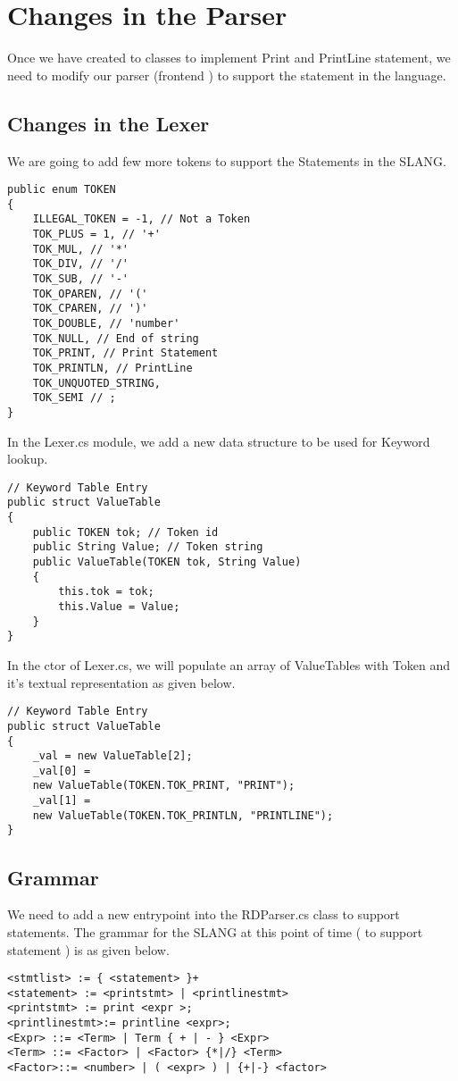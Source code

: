 \section{Changes in the Parser}
Once we have created to classes to implement Print and PrintLine statement, we need to modify our
parser (frontend ) to support the statement in the language.\\
\subsection{Changes in the Lexer}
We are going to add few more tokens to support the Statements in the SLANG.\\
\lstset{style=csharp}
\begin{lstlisting}
public enum TOKEN
{
	ILLEGAL_TOKEN = -1, // Not a Token
	TOK_PLUS = 1, // '+'
	TOK_MUL, // '*'
	TOK_DIV, // '/'
	TOK_SUB, // '-'
	TOK_OPAREN, // '('
	TOK_CPAREN, // ')'
	TOK_DOUBLE, // 'number'
	TOK_NULL, // End of string
	TOK_PRINT, // Print Statement
	TOK_PRINTLN, // PrintLine
	TOK_UNQUOTED_STRING,
	TOK_SEMI // ;
}
\end{lstlisting}
In the Lexer.cs module, we add a new data structure to be used for Keyword lookup.
\lstset{style=csharp}
\begin{lstlisting}
// Keyword Table Entry
public struct ValueTable
{
	public TOKEN tok; // Token id
	public String Value; // Token string
	public ValueTable(TOKEN tok, String Value)
	{
		this.tok = tok;
		this.Value = Value;
	}
}
\end{lstlisting}
In the ctor of Lexer.cs, we will populate an array of ValueTables with Token and it's textual representation as given below.
\lstset{style=csharp}
\begin{lstlisting}
// Keyword Table Entry
public struct ValueTable
{
	_val = new ValueTable[2];
	_val[0] = 
	new ValueTable(TOKEN.TOK_PRINT, "PRINT");
	_val[1] = 
	new ValueTable(TOKEN.TOK_PRINTLN, "PRINTLINE");
}
\end{lstlisting}
\subsection{Grammar}
We need to add a new entrypoint into the RDParser.cs class to support statements. The grammar for the SLANG at this point of time ( to support statement ) is as given below.
\lstset{style=csharp}
\begin{lstlisting}
<stmtlist> := { <statement> }+
<statement> := <printstmt> | <printlinestmt>
<printstmt> := print <expr >;
<printlinestmt>:= printline <expr>;
<Expr> ::= <Term> | Term { + | - } <Expr>
<Term> ::= <Factor> | <Factor> {*|/} <Term>
<Factor>::= <number> | ( <expr> ) | {+|-} <factor>
\end{lstlisting}

